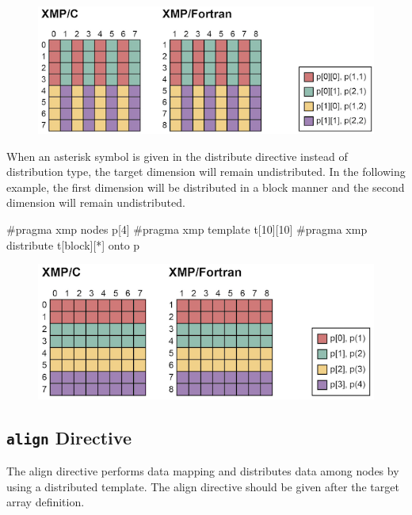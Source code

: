 \begin{figure}
  \centering
  \includegraphics{figs/multi2.png}
\end{figure}

When an asterisk symbol is given in the distribute directive instead of
distribution type, the target dimension will remain undistributed. In
the following example, the first dimension will be distributed in a
block manner and the second dimension will remain undistributed.

\begin{XCexample}
#pragma xmp nodes p[4]
#pragma xmp template t[10][10]
#pragma xmp distribute t[block][*] onto p
\end{XCexample}


\begin{figure}
  \centering
  \includegraphics{figs/multi3.png}
\end{figure}

\subsection{{\tt align} Directive}

The align directive performs data mapping and distributes data among
nodes by using a distributed template. The align directive should be
given after the target array definition.


